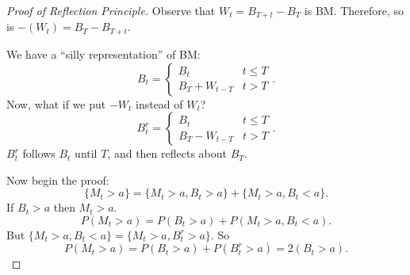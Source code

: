 \begin{proof}[Proof of Reflection Principle]
	Observe that $W_t = B_{T + t} - B_T$ is BM. Therefore, so is $- (W_t) = B_T - B_{T + t}$.
	
	We have a ``silly representation'' of BM:
	\[
		B_t = \begin{cases}
			B_t & t \le T\\
			B_T + W_{t - T} & t > T
		\end{cases}
	.\] 
	Now, what if we put $- W_t$ instead of $W_t$?
	\[
		B_t^r = \begin{cases}
			B_t & t \le T\\
			B_T - W_{t - T} & t > T
		\end{cases}
	.\]
	$B_t^r$ follows $B_t$ until $T$, and then reflects about  $B_T$.

	Now begin the proof:
	\[
		\{M_t > a\}  = \{M_t > a, B_t > a\}  + \{M_t > a, B_t < a\}  
	.\] 
	If $B_t > a$ then $M_t > a$.
	\[
		P(M_t > a) = P(B_t > a) + P(M_t > a, B_t < a)
	.\] 
	But $\{M_t > a, B_t < a\} = \{M_t > a, B_t^r > a\} $. So
	\[
		P(M_t > a) = P(B_t > a) + P(B_t^r > a)
		= 2(B_t > a)
	.\] 
\end{proof}
